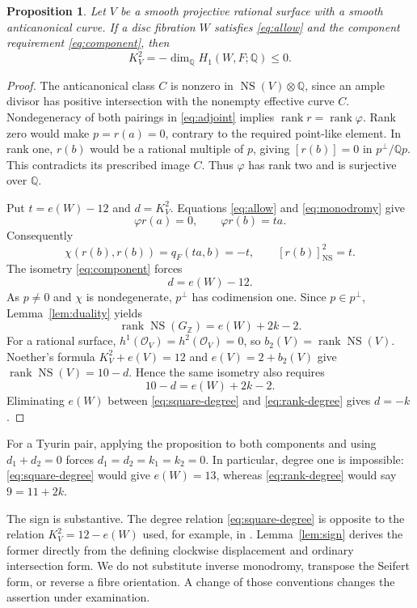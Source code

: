 \documentclass[11pt]{article}
\newtheorem{proposition}[theorem]{Proposition}
\theoremstyle{definition}
\theoremstyle{remark}
\newcommand{\Z}{\mathbb Z}
\newcommand{\Q}{\mathbb Q}
\newcommand{\NS}{\operatorname{NS}}
\newcommand{\rk}{\operatorname{rank}}
\newcommand{\OO}{\mathcal O}
\begin{document}
\begin{proposition}\label{prop:obstruction}
Let $V$ be a smooth projective rational surface with a smooth anticanonical curve. If a disc fibration $W$ satisfies \eqref{eq:allow} and the component requirement \eqref{eq:component}, then
\begin{equation}\label{eq:degree}
K_V^2=-\dim_{\Q}H_1(W,F;\Q)\leq0.
\end{equation}
\end{proposition}
\begin{proof}
The anticanonical class $C$ is nonzero in $\NS(V)\otimes\Q$, since an ample divisor has positive intersection with the nonempty effective curve $C$. Nondegeneracy of both pairings in \eqref{eq:adjoint} implies $\rk r=\rk\varphi$. Rank zero would make $p=r(a)=0$, contrary to the required point-like element. In rank one, $r(b)$ would be a rational multiple of $p$, giving $[r(b)]=0$ in $p^\perp/\Q p$. This contradicts its prescribed image $C$. Thus $\varphi$ has rank two and is surjective over $\Q$.

Put $t=e(W)-12$ and $d=K_V^2$. Equations \eqref{eq:allow} and \eqref{eq:monodromy} give
\[
\varphi r(a)=0,\qquad \varphi r(b)=ta.
\]
Consequently
\[
\chi(r(b),r(b))=q_F(ta,b)=-t,
\qquad [r(b)]_{\NS}^2=t.
\]
The isometry \eqref{eq:component} forces
\begin{equation}\label{eq:square-degree}
d=e(W)-12.
\end{equation}
As $p\ne0$ and $\chi$ is nondegenerate, $p^\perp$ has codimension one. Since $p\in p^\perp$, Lemma~\ref{lem:duality} yields
\[
\rk\NS(G_{\Z})=e(W)+2k-2.
\]
For a rational surface, $h^1(\OO_V)=h^2(\OO_V)=0$, so $b_2(V)=\rk\NS(V)$. Noether's formula $K_V^2+e(V)=12$ and $e(V)=2+b_2(V)$ give $\rk\NS(V)=10-d$. Hence the same isometry also requires
\begin{equation}\label{eq:rank-degree}
10-d=e(W)+2k-2.
\end{equation}
Eliminating $e(W)$ between \eqref{eq:square-degree} and \eqref{eq:rank-degree} gives $d=-k$.
\end{proof}

For a Tyurin pair, applying the proposition to both components and using $d_1+d_2=0$ forces $d_1=d_2=k_1=k_2=0$. In particular, degree one is impossible: \eqref{eq:square-degree} would give $e(W)=13$, whereas \eqref{eq:rank-degree} would say $9=11+2k$.

The sign is substantive. The degree relation \eqref{eq:square-degree} is opposite to the relation $K_V^2=12-e(W)$ used, for example, in \cite[\S5.2.2]{GT}. Lemma~\ref{lem:sign} derives the former directly from the defining clockwise displacement and ordinary intersection form. We do not substitute inverse monodromy, transpose the Seifert form, or reverse a fibre orientation. A change of those conventions changes the assertion under examination.
\end{document}
